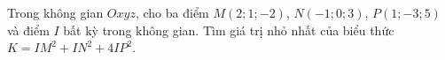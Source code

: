 \begin{ex}
Trong không gian $Oxyz$, cho ba điểm $M(2;1;-2)$, $N(-1;0;3)$, $P(1;-3;5)$ và điểm $I$ bất kỳ trong không gian. Tìm giá trị nhỏ nhất của biểu thức $K=IM^2+IN^2+4IP^2$.
\end{ex}
